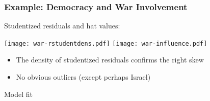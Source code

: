 \documentclass{beamer}
\begin{document}
\begin{frame}
\frametitle{Example: Democracy and War Involvement}
Studentized residuals and hat values:
\begin{center}
\texttt{[image: war-rstudentdens.pdf]}
\texttt{[image: war-influence.pdf]}
\end{center}
\pause
\begin{itemize}
\item The density of studentized residuals confirms the right skew
\item No obvious outliers (except perhaps Israel)
\end{itemize}

\end{frame}


\begin{frame}
\huge

Model fit


\end{frame}
\end{document}
